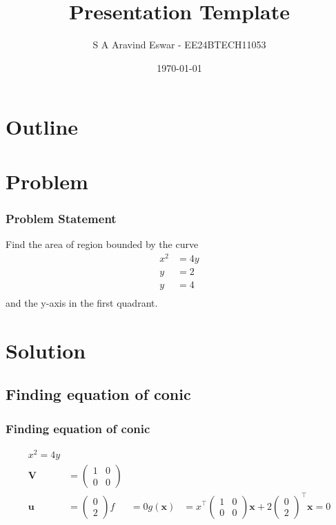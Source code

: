 \documentclass{beamer}
\title{Presentation Template}
\author{S A Aravind Eswar - EE24BTECH11053}
\date{\today}
\theoremstyle{remark}
\newcommand{\myvec}[1]{\ensuremath{\begin{pmatrix}#1\end{pmatrix}}}
\let\vec\mathbf
\numberwithin{equation}{section}
\begin{document}
\begin{frame}
\titlepage
\end{frame}

\section*{Outline}
\begin{frame}
\tableofcontents
\end{frame}
\section{Problem}
\begin{frame}
\frametitle{Problem Statement}
%
Find the area of region bounded by the curve 
\begin{align}
    x^2 &= 4y\\
    y&=2\\
    y&=4\\
\end{align}
and the y-axis in the first quadrant.
\end{frame}

\section{Solution}

\subsection{Finding equation of conic}
\begin{frame}
    \frametitle{Finding equation of conic}

    \begin{align}
        x^2 = 4y\\
        \vec{V} &= \myvec{1 & 0\\ 0 & 0}\\
        \vec{u} &= \myvec{0\\2}
        f &= 0
        g(\vec{x}) &= x^\top\myvec{1 & 0\\0 & 0}\vec{x} + 2\myvec{0\\2}^\top\vec{x} = 0
    \end{align}
\end{frame}
\end{document}
